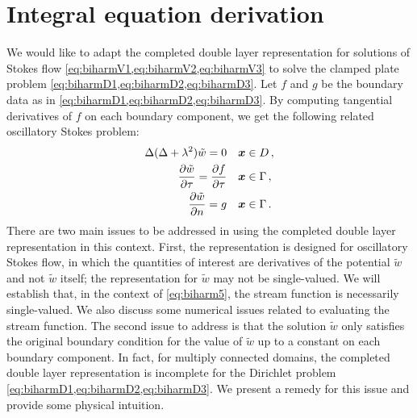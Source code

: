 
\section{Integral equation derivation} \label{sec:anapp}

We would like to adapt the completed double layer representation
for solutions of Stokes flow \cref{eq:biharmV1,eq:biharmV2,eq:biharmV3} to solve 
the clamped plate problem \cref{eq:biharmD1,eq:biharmD2,eq:biharmD3}.
Let $f$ and $g$ be the boundary data as in \cref{eq:biharmD1,eq:biharmD2,eq:biharmD3}. 
By computing tangential derivatives of $f$ on each
boundary component, we get the following related oscillatory Stokes
problem:
\begin{align}
 \Delta (\Delta + \lambda^2) \tilde{w}  = 0 &\quad {\boldsymbol x} \in D \, ,\nonumber\\
 \frac{\partial \tilde{w}}{\partial \tau} = 
 \frac{\partial f}{\partial \tau} 
&\quad {\boldsymbol x} \in \Gamma \label{eq:biharm5} \, ,\\ 
 \frac{\partial \tilde{w}}{\partial n} = g &\quad {\boldsymbol x} 
\in \Gamma 
\, . 
\nonumber
\end{align}
There are two main issues to be addressed in using the completed
double layer representation in this context. First,
the representation is designed for 
oscillatory Stokes flow, in which the quantities of interest are derivatives
of the potential $\tilde{w}$ and not $\tilde{w}$ itself; the
representation for $\tilde{w}$ may not be single-valued. 
We will establish that, in the context of \cref{eq:biharm5},
the stream function is necessarily single-valued. We also discuss
some numerical issues related to evaluating the stream function.
The second issue to address
is that the solution $\tilde{w}$ only satisfies the original boundary 
condition for the value of $\tilde{w}$ up to a constant on 
each boundary component.
In fact, for multiply connected domains, the completed double layer 
representation is incomplete for the Dirichlet
problem \cref{eq:biharmD1,eq:biharmD2,eq:biharmD3}. We present a remedy for this 
issue and provide some physical intuition.
%

